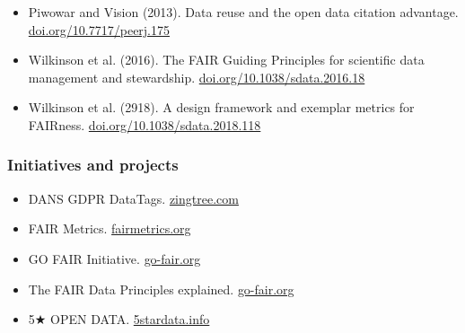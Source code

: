 \documentclass{article}
\begin{document}
\begin{itemize}
\item Piwowar and Vision (2013). Data reuse and the open data citation advantage. \href{https://doi.org/10.7717/peerj.175}{doi.org/10.7717/peerj.175}


\item Wilkinson et al. (2016). The FAIR Guiding Principles for scientific data management and stewardship. \href{https://doi.org/10.1038/sdata.2016.18}{doi.org/10.1038/sdata.2016.18}


\item Wilkinson et al. (2918). A design framework and exemplar metrics for FAIRness. \href{https://doi.org/10.1038/sdata.2018.118}{doi.org/10.1038/sdata.2018.118}


\end{itemize}

\subsubsection{\textbf{Initiatives and projects}}\label{initiatives-and-projects}


\begin{itemize}
\item DANS GDPR DataTags. \href{https://zingtree.com/host.php?style=buttons&tree_id=442670046&persist_names=Restart&persist_node_ids=58#58}{zingtree.com}


\item FAIR Metrics. \href{http://fairmetrics.org/}{fairmetrics.org}


\item GO FAIR Initiative. \href{https://www.go-fair.org/}{go-fair.org}


\item The FAIR Data Principles explained. \href{https://www.go-fair.org/fair-principles/}{go-fair.org}


\item 5★ OPEN DATA. \href{http://5stardata.info/en/}{5stardata.info}


\end{itemize}
\end{document}
